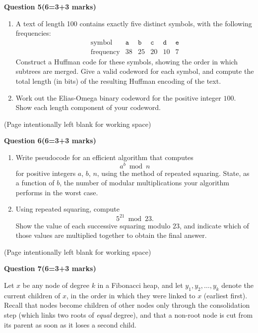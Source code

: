 \documentclass[12pt,letterpaper]{article}
\newcommand{\marksbox}[1]{%
  \vfill
  \begin{flushright}
    \fbox{\parbox[c][1.1cm][c]{1.3cm}{\centering #1}}
  \end{flushright}
}
\newcommand{\questiontitle}[2]{%
  \textbf{Question #1}\hfill\textbf{(#2 marks)}
}
\newcommand{\workingpage}{%
  \newpage
  \begin{center}
    (Page intentionally left blank for working space)
  \end{center}
}
\begin{document}
\questiontitle{5}{6=3+3}

\begin{enumerate}
  \item[(i)] A text of length 100 contains exactly five distinct symbols,
  with the following frequencies:
  \[
  \begin{array}{c|ccccc}
    \text{symbol} & \texttt{a} & \texttt{b} & \texttt{c} & \texttt{d} & \texttt{e} \\
    \hline
    \text{frequency} & 38 & 25 & 20 & 10 & 7
  \end{array}
  \]
  Construct a Huffman code for these symbols, showing the order in which
  subtrees are merged. Give a valid codeword for each symbol, and compute the
  total length (in bits) of the resulting Huffman encoding of the text.

  \item[(ii)] Work out the Elias-Omega binary codeword for the positive
  integer $100$. Show each length component of your codeword.
\end{enumerate}

\marksbox{6}

\workingpage
\newpage

\questiontitle{6}{6=3+3}

\begin{enumerate}
  \item[(i)] Write pseudocode for an efficient algorithm that computes
  \[
    a^{b} \bmod n
  \]
  for positive integers $a$, $b$, $n$, using the method of repeated squaring.
  State, as a function of $b$, the number of modular multiplications your
  algorithm performs in the worst case.

  \item[(ii)] Using repeated squaring, compute
  \[
    5^{21} \bmod 23.
  \]
  Show the value of each successive squaring modulo $23$, and indicate which
  of those values are multiplied together to obtain the final answer.
\end{enumerate}

\marksbox{6}

\workingpage
\newpage

\questiontitle{7}{6=3+3}

Let $x$ be any node of degree $k$ in a Fibonacci heap, and let
$y_1, y_2, \ldots, y_k$ denote the current children of $x$, in the order in
which they were linked to $x$ (earliest first). Recall that nodes become
children of other nodes only through the consolidation step (which links two
roots of \emph{equal} degree), and that a non-root node is cut from its parent
as soon as it loses a second child.
\end{document}
